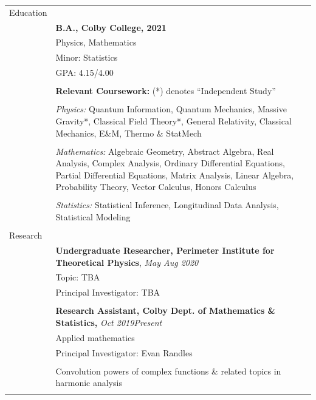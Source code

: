 \documentclass[10pt]{article}
\begin{document}
\noindent \begin{longtable}{ l m{13.5cm}   }

	
  \large{Education}    	& \\ 
  						& \textbf{B.A., Colby College, 2021} \\
     				 	& Physics, Mathematics \\
     				 	& Minor: Statistics  \\
     					& GPA: 4.15/4.00 \\
	 					& \\
	 					& \textbf{Relevant Coursework:} (*) denotes ``Independent Study'' \\ \vspace{-12pt}
	 					& \\
	 					& \textit{Physics:} Quantum Information, Quantum Mechanics, Massive Gravity*, Classical Field Theory*,  General Relativity, Classical Mechanics, E\&M, Thermo \& StatMech\\  \vspace{-9pt}
	 					& \\
	 					& \textit{Mathematics:} Algebraic Geometry, Abstract Algebra, Real Analysis, Complex Analysis, Ordinary Differential Equations, Partial Differential Equations, Matrix Analysis, Linear Algebra, Probability Theory, Vector Calculus, Honors Calculus\\   \vspace{-9pt}
	 					& \\ 
	 					& \textit{Statistics:} Statistical Inference, Longitudinal Data Analysis, Statistical Modeling\\
	 					& \\
    
        
  \large{Research}      & \\  
  						& \textbf{Undergraduate Researcher, Perimeter Institute for Theoretical Physics}, \textit{May \textendash Aug 2020}\\
  						& Topic: TBA \\
  						& Principal Investigator: TBA \\
  						& \\
  						
  						& \textbf{Research Assistant, Colby Dept. of Mathematics \& Statistics,} \textit{Oct 2019\textendash Present }\\
  						& Applied mathematics \\
  						& Principal Investigator: Evan Randles  \\ \vspace{-9pt}
  						& \\
  						& Convolution powers of complex functions \& related topics in harmonic analysis \\
  						& \\
  						

\end{longtable}
\end{document}
